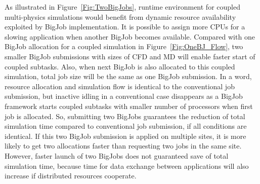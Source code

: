 \documentclass[conference,final]{IEEEtran}
\begin{document}
As illustrated in Figure~\ref{Fig:TwoBigJobs}, runtime environment for
coupled multi-physics simulations would benefit from dynamic resource
availability exploited by BigJob implementation. It is
possible to assign more CPUs for a slowing application when another
BigJob becomes available. Compared with one BigJob allocation for a
coupled simulation in Figure~\ref{Fig:OneBJ_Flow}, two smaller BigJob
submissions with sizes of CFD and MD will enable faster start of
coupled subtasks. Also, when next BigJob is also allocated to this
coupled simulation, total job size will be the same as one BigJob
submission. In a word, resource allocation and simulation flow is
identical to the conventional job submission, but inactive idling in a
conventional case disappears as a BigJob framework starts coupled
subtasks with smaller number of processors when first job is
allocated. So, submitting two BigJobs guarantees the reduction of
total simulation time compared to conventional job submission, if all
conditions are identical. If this two BigJob submission is applied on
multiple sites, it is more likely to get two allocations faster than
requesting two jobs in the same site. However, faster launch of two
BigJobs does not guaranteed save of total simulation time, because
time for data exchange between applications will also increase if
distributed resources cooperate.
\end{document}
